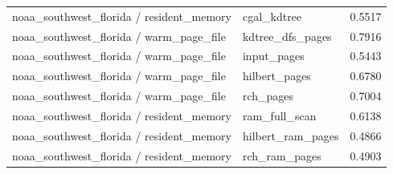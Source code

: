 \begin{tabular}{llr}
noaa\_southwest\_florida / resident\_memory & cgal\_kdtree & 0.5517 \\
noaa\_southwest\_florida / warm\_page\_file & kdtree\_dfs\_pages & 0.7916 \\
noaa\_southwest\_florida / warm\_page\_file & input\_pages & 0.5443 \\
noaa\_southwest\_florida / warm\_page\_file & hilbert\_pages & 0.6780 \\
noaa\_southwest\_florida / warm\_page\_file & rch\_pages & 0.7004 \\
noaa\_southwest\_florida / resident\_memory & ram\_full\_scan & 0.6138 \\
noaa\_southwest\_florida / resident\_memory & hilbert\_ram\_pages & 0.4866 \\
noaa\_southwest\_florida / resident\_memory & rch\_ram\_pages & 0.4903 \\
\end{tabular}
